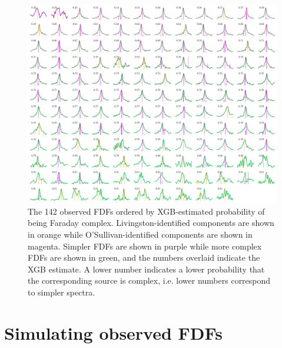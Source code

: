  \begin{figure}
    \centering
    \includegraphics[width=\linewidth]{faraday-images/both_spectra_xgb.pdf}
    \caption{The 142 observed FDFs ordered by XGB-estimated probability of being Faraday complex. Livingston-identified components are shown in orange while O'Sullivan-identified components are shown in magenta. Simpler FDFs are shown in purple while more complex FDFs are shown in green, and the numbers overlaid indicate the XGB estimate. A lower number indicates a lower probability that the corresponding source is complex, i.e. lower numbers correspond to simpler spectra.}
    \label{fig:all-observed-fdfs-xgb}
  \end{figure}

\section{Simulating observed FDFs}
\label{sec:faraday-simulating}


